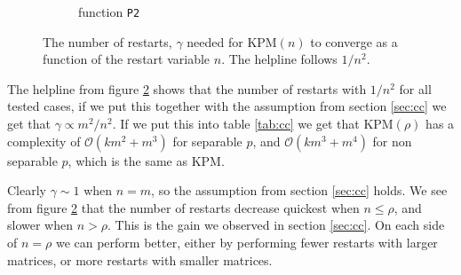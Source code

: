\begin{figure}[H]
\begin{subfigure}[b]{0.45\textwidth}
                \caption{function \texttt{P2}}
                \label{fig:ant2}
        \end{subfigure}
        \caption{The number of restarts, $\gamma$ needed for KPM$(n)$ to converge as a function of the restart variable $n$. The helpline follows $1/n^2$.}\label{fig:ant}
\end{figure}

The helpline from figure \ref{fig:ant} shows that the number of restarts with $1/n^2$ for all tested cases, if we put this together with the assumption from section \ref{sec:cc} we get that $\gamma \propto  m^2/n^2$. If we put this into table \ref{tab:cc} we get that KPM$(\rho)$ has a complexity of $\mathcal{O}(km^2 + m^3)$ for separable $p$, and $\mathcal{O}(km^3 + m^4)$ for non separable $p$, which is the same as KPM.

Clearly $\gamma \sim 1$ when $n=m$, so the assumption from section \ref{sec:cc} holds. We see from figure \ref{fig:ant} that the number of restarts decrease quickest when $n \leq \rho $, and slower when $n > \rho$. This is the gain we observed in section \ref{sec:cc}. On each side of $n = \rho$ we can perform better, either by performing fewer restarts with larger matrices, or more restarts with smaller matrices. \\
